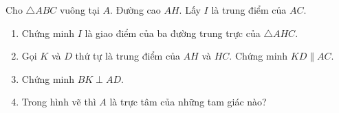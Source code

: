\begin{vd}%
Cho $\triangle ABC$ vuông tại $A$. Đường cao $AH$. Lấy $I$ là trung điểm của $AC$.
\begin{enumerate}
	\item Chứng minh $I$ là giao điểm của ba đường trung trực của $\triangle AHC$.
	\item Gọi $K$ và $D$ thứ tự là trung điểm của $AH$ và $HC$. Chứng minh $KD\parallel AC$.
	\item Chứng minh $BK\perp AD$.
	\item Trong hình vẽ thì $A$ là trực tâm của những tam giác nào?
\end{enumerate} 
\end{vd}
